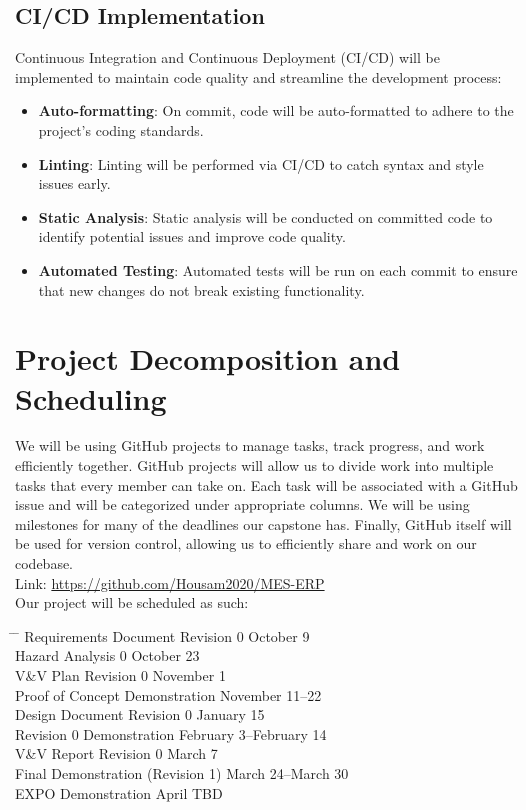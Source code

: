 \documentclass{article}
\begin{document}
\subsection{CI/CD Implementation}
Continuous Integration and Continuous Deployment (CI/CD) will be implemented to maintain code quality and streamline the development process:
\begin{itemize}
    \item \textbf{Auto-formatting}: On commit, code will be auto-formatted to adhere to the project's coding standards.
    \item \textbf{Linting}: Linting will be performed via CI/CD to catch syntax and style issues early.
    \item \textbf{Static Analysis}: Static analysis will be conducted on committed code to identify potential issues and improve code quality.
    \item \textbf{Automated Testing}: Automated tests will be run on each commit to ensure that new changes do not break existing functionality.
\end{itemize}

\section{Project Decomposition and Scheduling}

We will be using GitHub projects to manage tasks, track progress, and work efficiently together. 
GitHub projects will allow us to divide work into multiple tasks that every member can take on. 
Each task will be associated with a GitHub issue and will be categorized under appropriate columns. 
We will be using milestones for many of the deadlines our capstone has. Finally, GitHub itself will 
be used for version control, allowing us to efficiently share and work on our codebase. \\

Link: \href{https://github.com/Housam2020/MES-ERP}{https://github.com/Housam2020/MES-ERP} \\

Our project will be scheduled as such: \\

\begin{tabbing}
  \hspace{8cm} \= \hspace{3cm} \= \kill
  Requirements Document Revision 0 \> October 9 \\
  Hazard Analysis 0 \> October 23 \\
  V\&V Plan Revision 0 \> November 1 \\
  Proof of Concept Demonstration \> November 11--22 \\
  Design Document Revision 0 \> January 15 \\
  Revision 0 Demonstration \> February 3--February 14 \\
  V\&V Report Revision 0 \> March 7 \\
  Final Demonstration (Revision 1) \> March 24--March 30 \\
  EXPO Demonstration \> April TBD \\
\end{tabbing}
\end{document}

